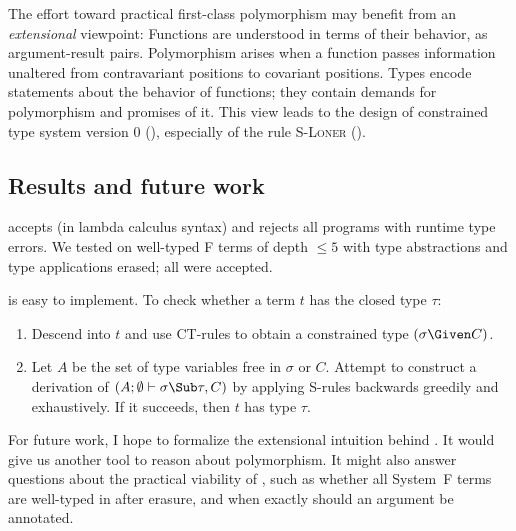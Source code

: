 \documentclass{amsart}
\begin{document}
The effort toward practical first-class polymorphism may benefit
from an \emph{extensional} viewpoint: Functions are understood in
terms of their behavior, as argument-result pairs. Polymorphism
arises when a function passes information unaltered from
contravariant positions to covariant positions. Types encode
statements about the behavior of functions; they contain demands
for polymorphism and promises of it. This view leads to the
design of constrained type system version 0 (), especially of
the rule \textsc{S-Loner} ().

\subsection{Results and future work}

 accepts  (in lambda calculus syntax) and rejects all
programs with runtime type errors. We tested  on well-typed F
terms of depth $\le5$ with type abstractions and type
applications erased; all were accepted.

 is easy to implement. To check whether a term $t$ has the
closed type $\tau$:
\begin{enumerate}
\item Descend into $t$ and use CT-rules to obtain a constrained
type $(\sigma\Given C)$.
\item Let $A$ be the set of type variables free in $\sigma$ or
$C$. Attempt to construct a derivation of
$(A;\emptyset\vdash\sigma\Sub\tau,C)$ by applying S-rules
backwards greedily and exhaustively. If it succeeds, then $t$ has
type $\tau$.
\end{enumerate}

For future work, I hope to formalize the extensional intuition
behind . It would give us another tool to reason about
polymorphism. It might also answer questions about the practical
viability of , such as whether all System~F terms are
well-typed in  after erasure, and when exactly should an
argument be annotated.

\newpage\normalsize

\end{document}
